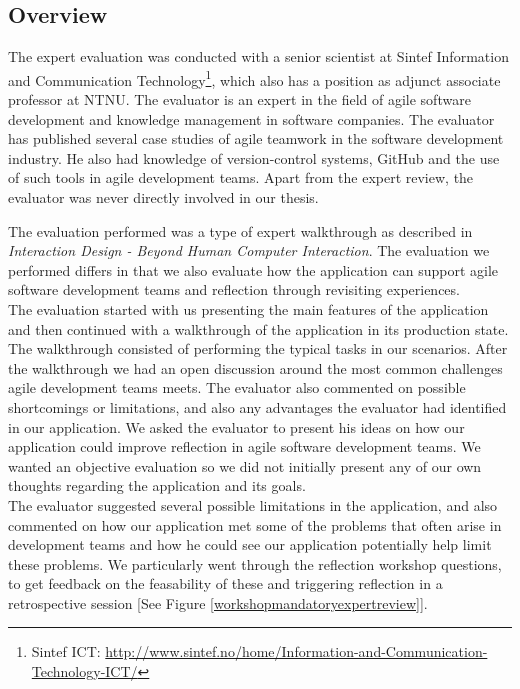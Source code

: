 \subsection{Overview}
The expert evaluation was conducted with a senior scientist at Sintef Information and Communication Technology\footnote{Sintef ICT: \url{http://www.sintef.no/home/Information-and-Communication-Technology-ICT/}}, which also has a position as adjunct associate professor at NTNU. The evaluator is an expert in the field of agile software development and knowledge management in software companies. The evaluator has published several case studies of agile teamwork in the software development industry. He also had knowledge of version-control systems, GitHub and the use of such tools in agile development teams. Apart from the expert review, the evaluator was never directly involved in our thesis.

The evaluation performed was a type of expert walkthrough as described in \emph{Interaction Design - Beyond Human Computer Interaction}\cite{rogers2011interaction}. The evaluation we performed differs in that we also evaluate how the application can support agile software development teams and reflection through revisiting experiences. \\ 
The evaluation started with us presenting the main features of the application and then continued with a walkthrough of the application in its production state. The walkthrough consisted of performing the typical tasks in our scenarios. After the walkthrough we had an open discussion around the most common challenges agile development teams meets.  The evaluator also commented on possible shortcomings or limitations, and also any advantages the evaluator had identified in our application. We asked the evaluator to present his ideas on how our application could improve reflection in agile software development teams. We wanted an objective evaluation so we did not initially present any of our own thoughts regarding the application and its goals. \\

The evaluator suggested several possible limitations in the application, and also commented on how our application met some of the problems that often arise in development teams and how he could see our application potentially help limit these problems. We particularly went through the reflection workshop questions, to get feedback on the feasability of these and triggering reflection in a retrospective session [See Figure \ref{workshopmandatoryexpertreview}]. 


